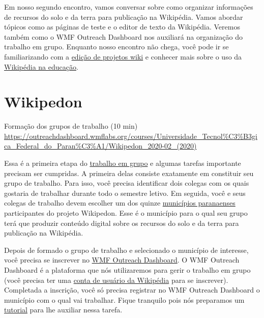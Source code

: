 \documentclass[
  11pt,
  a4paper,
  dvipsnames]{tufte-book}
\begin{document}
Em nosso segundo encontro, vamos conversar sobre como organizar informações de recursos do solo e da terra para publicação na Wikipédia. Vamos abordar tópicos como as páginas de teste e o editor de texto da Wikipédia. Veremos também como o WMF Outreach Dashboard nos auxiliará na organização do trabalho em grupo. Enquanto nosso encontro não chega, você pode ir se familiarizando com a \href{https://pt.wikiversity.org/wiki/Ajuda:Como_editar_em_um_projeto_Wiki}{edição de projetos wiki} e conhecer mais sobre o uso da \href{https://pt.wikiversity.org/wiki/Oficinas_Wikimedia_\%26_Educa\%C3\%A7\%C3\%A3o}{Wikipédia na educação}.

\hypertarget{wikipedon}{%
\section{Wikipedon}\label{wikipedon}}

Formação dos grupos de trabalho (10 min)
\url{https://outreachdashboard.wmflabs.org/courses/Universidade_Tecnol\%C3\%B3gica_Federal_do_Paran\%C3\%A1/Wikipedon_2020-02_(2020)}

Essa é a primeira etapa do \href{https://pt.wikiversity.org/wiki/Wikipedon}{trabalho em grupo} e algumas tarefas importante precisam ser cumpridas. A primeira delas consiste exatamente em constituir seu grupo de trabalho. Para isso, você precisa identificar dois colegas com os quais gostaria de trabalhar durante todo o semestre letivo. Em seguida, você e seus colegas de trabalho devem escolher um dos quinze \href{https://outreachdashboard.wmflabs.org/courses/Universidade_Tecnol\%C3\%B3gica_Federal_do_Paran\%C3\%A1/Wikipedon_2020-02_(2020)/articles/available}{municípios paranaenses} participantes do projeto Wikipedon. Esse é o município para o qual seu grupo terá que produzir conteúdo digital sobre os recursos do solo e da terra para publicação na Wikipédia.

Depois de formado o grupo de trabalho e selecionado o município de interesse, você precisa se inscrever no \href{https://outreachdashboard.wmflabs.org/courses/Universidade_Tecnológica_Federal_do_Paraná/Wikipedon_2020-02_(2020)?locale=pt-br\&enroll=nitossolo?locale=pt-br}{WMF Outreach Dashboard}. O WMF Outreach Dashboard é a plataforma que nós utilizaremos para gerir o trabalho em grupo (você precisa ter uma \href{https://pt.wikipedia.org/w/index.php?title=Especial:Criar_conta}{conta de usuário da Wikipédia} para se inscrever). Completada a inscrição, você só precisa registrar no WMF Outreach Dashboard o município com o qual vai trabalhar. Fique tranquilo pois nós preparamos um \href{https://pt.wikiversity.org/wiki/Wikipedon}{tutorial} para lhe auxiliar nessa tarefa.
\end{document}
